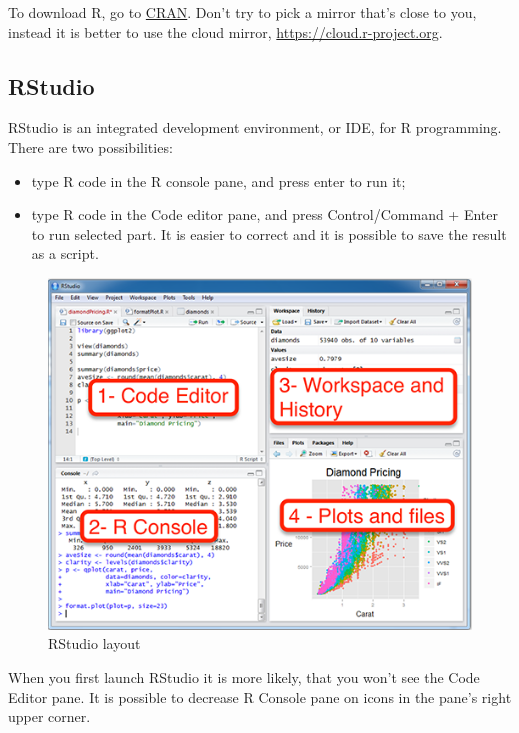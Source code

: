 \documentclass[]{book}
\providecommand{\tightlist}{%
  \setlength{\itemsep}{0pt}\setlength{\parskip}{0pt}}
\theoremstyle{definition}
\theoremstyle{definition}
\theoremstyle{definition}
\theoremstyle{remark}
\begin{document}
To download R, go to \href{https://cran.r-project.org/}{CRAN}. Don't try
to pick a mirror that's close to you, instead it is better to use the
cloud mirror, \url{https://cloud.r-project.org}.

\subsection{RStudio}\label{rstudio}

RStudio is an integrated development environment, or IDE, for R
programming. There are two possibilities:

\begin{itemize}
\tightlist
\item
  type R code in the R console pane, and press enter to run it;
\item
  type R code in the Code editor pane, and press Control/Command + Enter
  to run selected part. It is easier to correct and it is possible to
  save the result as a script.
\end{itemize}

\begin{figure}

{\centering \includegraphics[width=5in]{images/02-rstudio} 

}

\caption{RStudio layout}\label{fig:rstudio}
\end{figure}

When you first launch RStudio it is more likely, that you won't see the
Code Editor pane. It is possible to decrease R Console pane on icons in
the pane's right upper corner.
\end{document}
